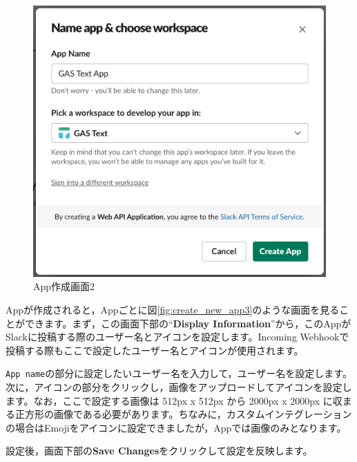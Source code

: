 \documentclass[uplatex,a4j]{jsarticle}
\begin{document}
\begin{figure}[H]
 \centering
 \includegraphics[keepaspectratio, scale=0.55]{images/create_new_app2.png}
 \caption{App作成画面2}
 \label{fig:create_new_app2}
\end{figure}

Appが作成されると，Appごとに図\ref{fig:create_new_app3}のような画面を見ることができます。まず，この画面下部の``\textbf{Display Information}''から，このAppがSlackに投稿する際のユーザー名とアイコンを設定します。Incoming Webhookで投稿する際もここで設定したユーザー名とアイコンが使用されます。

\verb|App name|の部分に設定したいユーザー名を入力して，ユーザー名を設定します。\\
次に，アイコンの部分をクリックし，画像をアップロードしてアイコンを設定します。なお，ここで設定する画像は 512px x 512px から 2000px x 2000px に収まる正方形の画像である必要があります。ちなみに，カスタムインテグレーションの場合はEmojiをアイコンに設定できましたが，Appでは画像のみとなります。


設定後，画面下部の\textbf{Save Changes}をクリックして設定を反映します。
\end{document}
